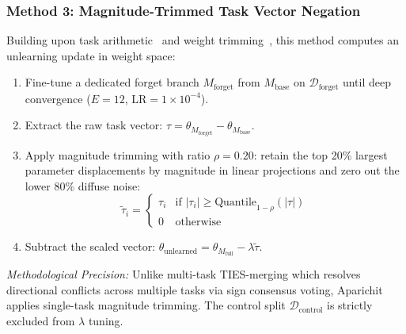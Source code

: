 \documentclass[11pt,a4paper]{article}
\begin{document}
\subsubsection{Method 3: Magnitude-Trimmed Task Vector Negation}
Building upon task arithmetic~\cite{ilharco2023editing} and weight trimming~\cite{yadav2023ties}, this method computes an unlearning update in weight space:
\begin{enumerate}
    \item Fine-tune a dedicated forget branch $M_{\text{forget}}$ from $M_{\text{base}}$ on $\mathcal{D}_{\text{forget}}$ until deep convergence ($E=12$, $\text{LR}=1\times 10^{-4}$).
    \item Extract the raw task vector: $\tau = \theta_{M_{\text{forget}}} - \theta_{M_{\text{base}}}$.
    \item Apply magnitude trimming with ratio $\rho = 0.20$: retain the top 20\% largest parameter displacements by magnitude in linear projections and zero out the lower 80\% diffuse noise:
    \begin{equation}
    \tilde{\tau}_i = \begin{cases} \tau_i & \text{if } |\tau_i| \ge \text{Quantile}_{1-\rho}(|\tau|) \\ 0 & \text{otherwise} \end{cases}
    \end{equation}
    \item Subtract the scaled vector: $\theta_{\text{unlearned}} = \theta_{M_{\text{full}}} - \lambda \tilde{\tau}$.
\end{enumerate}
\textit{Methodological Precision:} Unlike multi-task TIES-merging which resolves directional conflicts across multiple tasks via sign consensus voting, Aparichit applies single-task magnitude trimming. The control split $\mathcal{D}_{\text{control}}$ is strictly excluded from $\lambda$ tuning.
\end{document}

